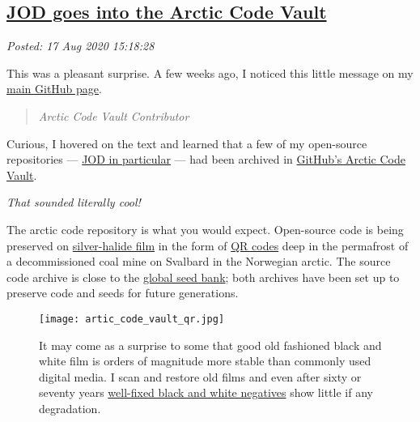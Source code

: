 %

\subsection*{\href{http://analyzethedatanotthedrivel.org/2020/08/17/jod-goes-into-the-arctic-code-vault/}{JOD goes into the Arctic Code Vault}}


\noindent\emph{Posted: 17 Aug 2020 15:18:28}
\vspace{6pt}

This was a pleasant surprise. A few weeks ago, I noticed this little
message on my \href{https://github.com/bakerjd99}{main GitHub page}.

\begin{quote}
\emph{Arctic Code Vault Contributor}
\end{quote}

Curious, I hovered on the text and learned that a few of my open-source
repositories --- \href{https://github.com/bakerjd99/jod}{JOD in
particular} --- had been archived in
\href{https://github.blog/2020-07-16-github-archive-program-the-journey-of-the-worlds-open-source-code-to-the-arctic/}{GitHub's
Arctic Code Vault}.

\emph{That sounded literally cool!}

The arctic code repository is what you would expect. Open-source code is
being preserved on
\href{https://www.piql.com/githubs-code-now-stored-forever-on-piqlfilm/}{silver-halide
film} in the form of \href{https://en.wikipedia.org/wiki/QR_code}{QR
codes} deep in the permafrost of a decommissioned coal mine on Svalbard
in the Norwegian arctic. The source code archive is close to the
\href{https://www.seedvault.no/}{global seed bank}; both archives have
been set up to preserve code and seeds for future generations.

\captionsetup[figure]{labelformat=empty}
\begin{SCfigure}
\centering
\texttt{[image: artic\_code\_vault\_qr.jpg]}
\caption{It may come as a surprise to some that good old fashioned black
and white film is orders of magnitude more stable than commonly used
digital media. I scan and restore old films and even after sixty or
seventy years
\href{http://www.film-photography-blog.com/film-processing-chemistry-how-does-it-work/}{well-fixed
black and white negatives} show little if any degradation.}
\label{fig:6083x0}
\end{SCfigure}

